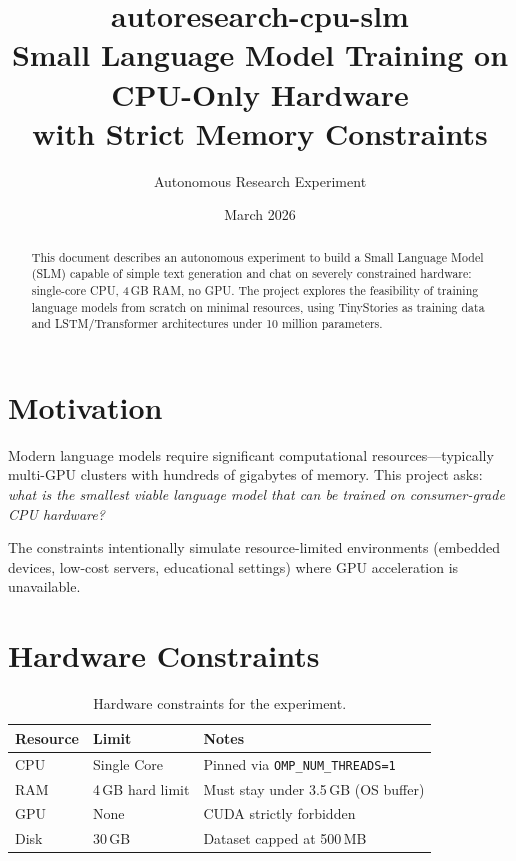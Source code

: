 \documentclass[11pt,a4paper]{article}
\title{\textbf{autoresearch-cpu-slm}\\[0.5em]
\large Small Language Model Training on CPU-Only Hardware\\
with Strict Memory Constraints}
\author{Autonomous Research Experiment}
\date{March 2026}
\begin{document}
\maketitle

\begin{abstract}
This document describes an autonomous experiment to build a Small Language Model (SLM) capable of simple text generation and chat on severely constrained hardware: single-core CPU, 4\,GB RAM, no GPU. The project explores the feasibility of training language models from scratch on minimal resources, using TinyStories as training data and LSTM/Transformer architectures under 10 million parameters.
\end{abstract}

\tableofcontents
\newpage

\section{Motivation}

Modern language models require significant computational resources---typically multi-GPU clusters with hundreds of gigabytes of memory. This project asks: \textit{what is the smallest viable language model that can be trained on consumer-grade CPU hardware?}

The constraints intentionally simulate resource-limited environments (embedded devices, low-cost servers, educational settings) where GPU acceleration is unavailable.

\section{Hardware Constraints}

\begin{table}[h]
\centering
\begin{tabular}{@{}lll@{}}
\toprule
\textbf{Resource} & \textbf{Limit} & \textbf{Notes} \\
\midrule
CPU & Single Core & Pinned via \texttt{OMP\_NUM\_THREADS=1} \\
RAM & 4\,GB hard limit & Must stay under 3.5\,GB (OS buffer) \\
GPU & None & CUDA strictly forbidden \\
Disk & 30\,GB & Dataset capped at 500\,MB \\
\bottomrule
\end{tabular}
\caption{Hardware constraints for the experiment.}
\end{table}
\end{document}
